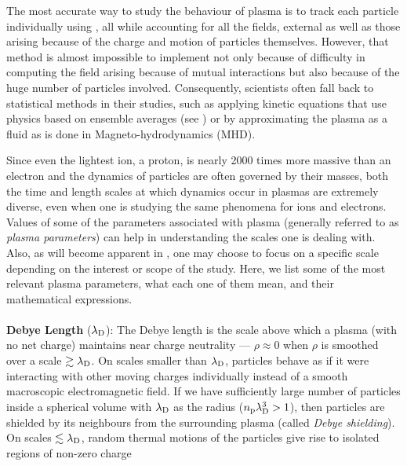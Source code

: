        The most accurate way to study the behaviour of plasma is to track each particle
        individually using , all while accounting for all the
        fields, external as well as those arising because of the charge and motion of particles
        themselves. However, that method is almost impossible to implement not only because of
        difficulty in computing the field arising because of mutual interactions but also because of
        the huge number of particles involved. Consequently, scientists often fall back to
        statistical methods in their studies, such as applying kinetic equations that use physics
        based on ensemble averages (see ) or by approximating the plasma as a fluid
        as is done in Magneto-hydrodynamics (MHD).

        Since even the lightest ion, a proton, is nearly 2000 times more massive than an electron
        and the dynamics of particles are often governed by their masses, both the time and length
        scales at which dynamics occur in plasmas are extremely diverse, even when one is studying
        the same phenomena for ions and electrons. Values of some of the parameters associated with
        plasma (generally referred to as \textit{plasma parameters}) can help in understanding the
        scales one is dealing with. Also, as will become apparent in ,
        one may choose to focus on a specific scale depending on the interest or scope of the study.
        Here, we list some of the most relevant plasma parameters, what each one of them mean, and
        their mathematical expressions.\\
        \\
        \textbf{Debye Length} ($\lambda_{\rm D}$): The Debye length  is the scale above which a
        plasma (with no net charge) maintains near charge neutrality --- $\rho \approx 0$ when
        $\rho$ is smoothed over a scale $\gtrsim \lambda_{\rm D}$. On scales smaller than
        $\lambda_{\rm D}$, particles behave as if it were interacting with other moving charges
        individually instead of a smooth macroscopic electromagnetic field. If we have sufficiently
        large number of particles inside a spherical volume with $\lambda_{\rm D}$ as the radius
        ($n_{\rm p} \lambda_{\rm D}^3 > 1$), then particles are shielded by its neighbours from the
        surrounding plasma (called \textit{Debye shielding}). On scales $\lesssim \lambda_{\rm D}$,
        random thermal motions of the particles give rise to isolated regions of non-zero charge
